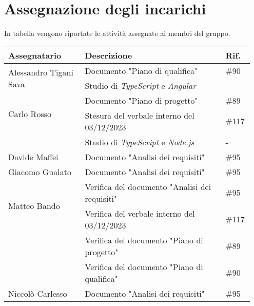 \section{Assegnazione degli incarichi}
In tabella vengono riportate le attività assegnate ai membri del gruppo.
\begin{center}
	{
		\renewcommand{\arraystretch}{1.5}
		\begin{tabular}{p{0.30\linewidth}|p{0.55\linewidth}|p{0.10\linewidth}}
			\textbf{Assegnatario}                   & \textbf{Descrizione}                             & \textbf{Rif.} \\
			\hline
			\multirow{2}{*}{Alessandro Tigani Sava} & Documento "Piano di qualifica"                   & \#90          \\
			\cline{2-3}
			                                        & Studio di \textit{TypeScript} e \textit{Angular} & -             \\
			\hline
			\multirow{2}{*}{Carlo Rosso}            & Documento "Piano di progetto"                    & \#89          \\
			\cline{2-3}
			                                        & Stesura del verbale interno del 03/12/2023       & \#117         \\
			\cline{2-3}
			                                        & Studio di \textit{TypeScript} e \textit{Node.js} & -             \\
			\hline
			Davide Maffei                           & Documento "Analisi dei requisiti"                & \#95          \\
			\hline
			Giacomo Gualato                         & Documento "Analisi dei requisiti"                & \#95          \\
			\hline
			\multirow{2}{*}{Matteo Bando}            & Verifica del documento "Analisi dei requisiti"   & \#95          \\
			\cline{2-3}
			                                        & Verifica del verbale interno del 03/12/2023      & \#117         \\
			\cline{2-3}
			                                        & Verifica del documento "Piano di progetto"       & \#89          \\
			\cline{2-3}
			                                        & Verifica del documento "Piano di qualifica"      & \#90          \\
			\hline
			Niccolò Carlesso                        & Documento "Analisi dei requisiti"                & \#95          \\
			\hline
		\end{tabular}
	}
\end{center}
